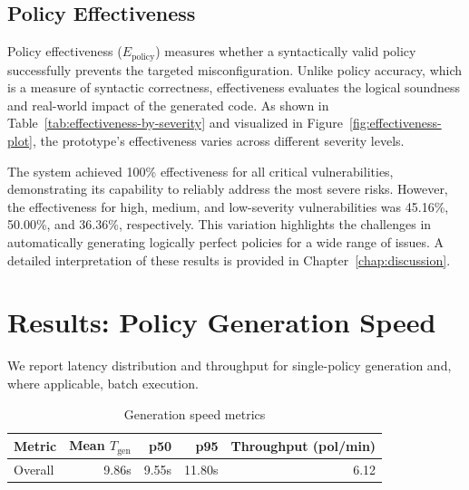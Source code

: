 \subsection{Policy Effectiveness}
Policy effectiveness ($E_{\text{policy}}$) measures whether a syntactically valid policy successfully prevents the targeted misconfiguration. Unlike policy accuracy, which is a measure of syntactic correctness, effectiveness evaluates the logical soundness and real-world impact of the generated code. As shown in Table~\ref{tab:effectiveness-by-severity} and visualized in Figure~\ref{fig:effectiveness-plot}, the prototype's effectiveness varies across different severity levels.

The system achieved 100\% effectiveness for all critical vulnerabilities, demonstrating its capability to reliably address the most severe risks. However, the effectiveness for high, medium, and low-severity vulnerabilities was 45.16\%, 50.00\%, and 36.36\%, respectively. This variation highlights the challenges in automatically generating logically perfect policies for a wide range of issues. A detailed interpretation of these results is provided in Chapter~\ref{chap:discussion}.

\section{Results: Policy Generation Speed}\label{sec:results-speed}


We report latency distribution and throughput for single-policy generation and, where applicable, batch execution.

\begin{table}[htbp]
	\centering
		\caption{Generation speed metrics}\label{tab:speed-metrics}
	\begin{tabular}{lrrrr}
		\hline
		Metric & Mean $T_{\text{gen}}$ & p50 & p95 & Throughput (pol/min) \\
		\hline
		Overall & 9.86s & 9.55s & 11.80s & 6.12 \\
		\hline
	\end{tabular}
\end{table}

